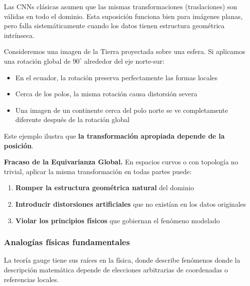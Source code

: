 Las CNNs clásicas asumen que las mismas transformaciones (traslaciones) son válidas en todo el dominio. Esta suposición funciona bien para imágenes planas, pero falla sistemáticamente cuando los datos tienen estructura geométrica intrínseca.

\begin{example}
Consideremos una imagen de la Tierra proyectada sobre una esfera. Si aplicamos una rotación global de $90^\circ$ alrededor del eje norte-sur:
\begin{itemize}
    \item En el ecuador, la rotación preserva perfectamente las formas locales
    \item Cerca de los polos, la misma rotación causa distorsión severa
    \item Una imagen de un continente cerca del polo norte se ve completamente diferente después de la rotación global
\end{itemize}
Este ejemplo ilustra que \textbf{la transformación apropiada depende de la posición}.
\end{example}

\textbf{Fracaso de la Equivarianza Global.} En espacios curvos o con topología no trivial, aplicar la misma transformación en todas partes puede:
\begin{enumerate}
    \item \textbf{Romper la estructura geométrica natural} del dominio
    \item \textbf{Introducir distorsiones artificiales} que no existían en los datos originales
    \item \textbf{Violar los principios físicos} que gobiernan el fenómeno modelado
\end{enumerate}

\subsubsection{Analogías físicas fundamentales}

La teoría gauge tiene sus raíces en la física, donde describe fenómenos donde la descripción matemática depende de elecciones arbitrarias de coordenadas o referencias locales.


